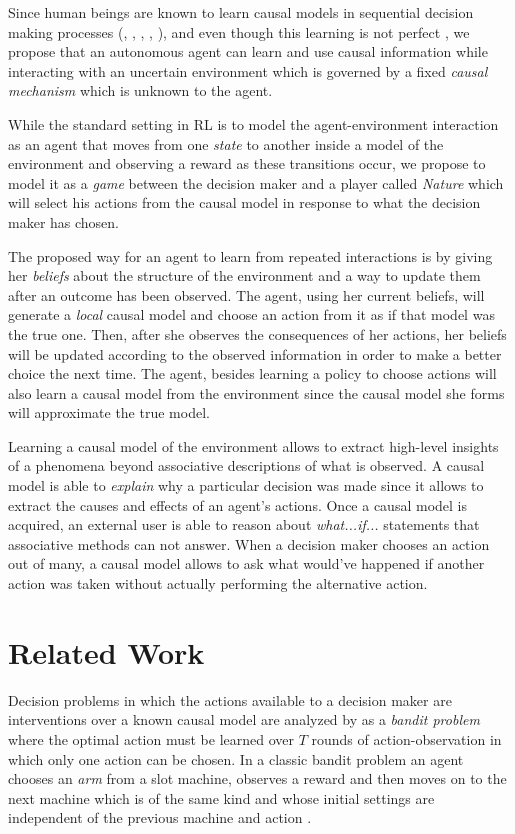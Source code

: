 \documentclass{article}
\begin{document}
Since human beings are known to learn causal models in sequential decision making processes (\cite{sloman2006causal}, \cite{nichols2007decision}, \cite{meder2010observing}, \cite{hagmayer2013repeated}, \cite{danks2014unifying}), and even though this learning is not perfect \cite{rottman2014reasoning}, we propose that an autonomous agent can learn and use causal information while interacting with an uncertain environment which is governed by a fixed \textit{causal mechanism} which is unknown to the agent.  

While the standard setting in RL is to model the agent-environment interaction as an agent that moves from one \textit{state} to another inside a model of the environment and observing a reward as these transitions occur, we propose to model it as a \textit{game} between the decision maker and a player called \textit{Nature} which will select his actions from the causal model in response to what the decision maker has chosen. 

The proposed way for an agent to learn from repeated interactions is by giving her \textit{beliefs} about the structure of the environment and a way to update them after an outcome has been observed. The agent, using her current beliefs, will generate a \textit{local} causal model and choose an action from it as if that model was the true one. Then, after she observes the consequences of her actions, her beliefs will be updated according to the observed information in order to make a better choice the next time. The agent, besides learning a policy to choose actions will also learn a causal model from the environment since the causal model she forms will approximate the true model.

Learning a causal model of the environment allows to extract high-level insights of a phenomena beyond associative descriptions of what is observed. A causal model is able to \textit{explain} why a particular decision was made since it allows to extract the causes and effects of an agent's actions. Once a causal model is acquired, an external user is able to reason about \textit{what...if...} statements that associative methods can not answer. When a decision maker chooses an action out of many, a causal model allows to ask what would've happened if another action was taken without actually performing the alternative action.

\section{Related Work}
Decision problems in which the actions available to a decision maker are interventions over a known causal model are analyzed by \cite{lattimoreNIPS2016} as a \textit{bandit problem} where the optimal action must be learned over $T$ rounds of action-observation in which only one action can be chosen. In a classic bandit problem an agent chooses an \textit{arm} from a slot machine, observes a reward and then moves on to the next machine which is of the same kind and whose initial settings are independent of the previous machine and action \cite{sutton1998reinforcement}.
\end{document}
